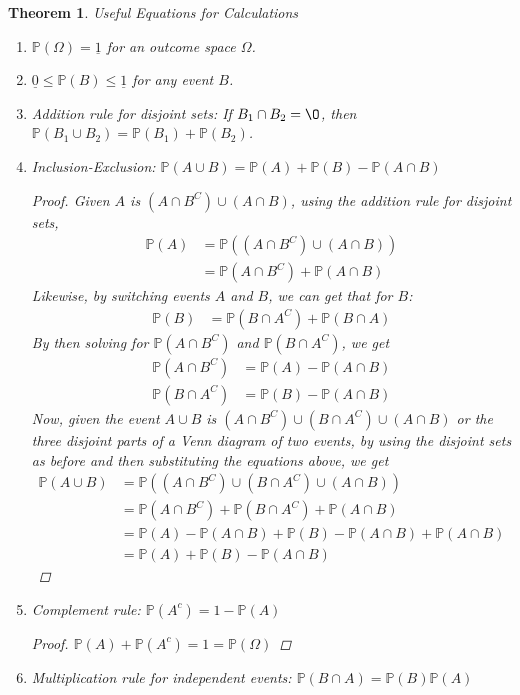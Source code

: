 \documentclass[12pt]{article}
\newcommand{\bbP}{\mathbb{P}}
\renewcommand{\emptyset}{\O}
\renewcommand{\_}[1]{\underline{ #1 }}
\newtheorem{theorem}{Theorem}[section]
\theoremstyle{definition}
\numberwithin{equation}{subsection}
\begin{document}
\begin{theorem} Useful Equations for Calculations
	\begin{enumerate}
	\item $\bbP(\Omega)=\_{1}$ for an outcome space $\Omega$. 
	\item $\_{0}\leq\bbP(B)\leq \_{1}$ for any event $B$.
	\item Addition rule for disjoint sets: If $B_1\cap B_2=\emptyset$, then $\bbP(B_1\cup B_2)=\bbP(B_1)+\bbP(B_2)$.\\
	\item Inclusion-Exclusion: $\bbP(A\cup B)=\bbP(A)+\bbP(B)-\bbP(A\cap B)$
		\begin{proof}
		Given $A$ is $(A\cap B^C)\cup (A\cap B)$, using the addition rule for disjoint sets, 
		\begin{align*}
			\bbP(A)&=\bbP((A\cap B^C)\cup (A\cap B)) \\
				&=\bbP(A\cap B^C)+\bbP(A\cap B)
		\end{align*}
		Likewise, by switching events $A$ and $B$, we can get that for $B$:
		\begin{align*}
			\bbP(B)&=\bbP(B\cap A^C)+\bbP(B\cap A)
		\end{align*}
		By then solving for $\bbP(A\cap B^C)$ and $\bbP(B\cap A^C)$, we get
		\begin{align*}
			\bbP(A\cap B^C)&=\bbP(A)-\bbP(A\cap B) \\
			\bbP(B\cap A^C)&=\bbP(B)-\bbP(A\cap B)
		\end{align*}
		Now, given the event $A\cup B$ is $(A\cap B^C)\cup (B\cap A^C)\cup (A\cap B)$ or the three disjoint parts of a Venn diagram of two events, by using the disjoint sets as before and then substituting the equations above, we get
		\begin{align*}
			\bbP(A\cup B)&=\bbP((A\cap B^C)\cup (B\cap A^C)\cup (A\cap B)) \\
				&=\bbP(A\cap B^C)+\bbP(B\cap A^C)+\bbP(A\cap B) \\
				&=\bbP(A)-\bbP(A\cap B)+\bbP(B)-\bbP(A\cap B)+\bbP(A\cap B) \\
				&=\bbP(A)+\bbP(B)-\bbP(A\cap B)
		\end{align*}
		\end{proof}
	\item Complement rule: $\bbP(A^c)=1-\bbP(A)$
		\begin{proof}
		$\bbP(A)+\bbP(A^c)=1=\bbP(\Omega)$
		\end{proof}
	\item Multiplication rule for independent events: $\mathbb{P}(B\cap A)=\mathbb{P}(B)\mathbb{P}(A)$	
	\end{enumerate}
\end{theorem}		
\end{document}
